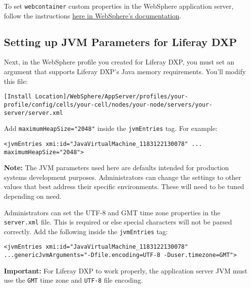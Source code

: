 To set \texttt{webcontainer} custom properties in the WebSphere
application server, follow the instructions
\href{http://www-01.ibm.com/support/docview.wss?rss=180&uid=swg21284395}{here
in WebSphere's documentation}.

\subsection{Setting up JVM Parameters for Liferay
DXP}\label{setting-up-jvm-parameters-for-liferay-dxp}

Next, in the WebSphere profile you created for Liferay DXP, you must set
an argument that supports Liferay DXP's Java memory requirements. You'll
modify this file:

\begin{verbatim}
[Install Location]/WebSphere/AppServer/profiles/your-profile/config/cells/your-cell/nodes/your-node/servers/your-server/server.xml
\end{verbatim}

Add \texttt{maximumHeapSize="2048"} inside the \texttt{jvmEntries} tag.
For example:

\begin{verbatim}
<jvmEntries xmi:id="JavaVirtualMachine_1183122130078" ... maximumHeapSize="2048">
\end{verbatim}

\noindent\hrulefill

\textbf{Note:} The JVM parameters used here are defaults intended for
production systems development purposes. Administrators can change the
settings to other values that best address their specific environments.
These will need to be tuned depending on need.

\noindent\hrulefill

Administrators can set the UTF-8 and GMT time zone properties in the
\texttt{server.xml} file. This is required or else special characters
will not be parsed correctly. Add the following inside the
\texttt{jvmEntries} tag:

\begin{verbatim}
<jvmEntries xmi:id="JavaVirtualMachine_1183122130078" ...genericJvmArguments="-Dfile.encoding=UTF-8 -Duser.timezone=GMT">
\end{verbatim}

\noindent\hrulefill

\textbf{Important:} For Liferay DXP to work properly, the application
server JVM must use the \texttt{GMT} time zone and \texttt{UTF-8} file
encoding.

